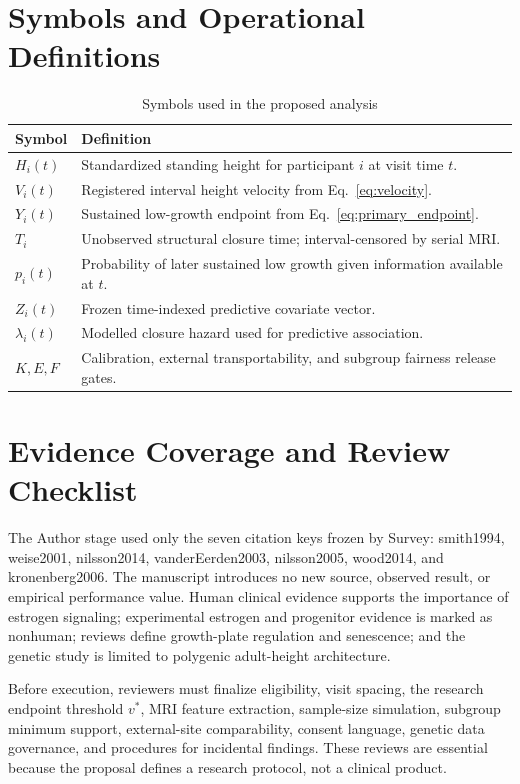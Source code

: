 \documentclass[conference]{IEEEtran}
\begin{document}
\section{Symbols and Operational Definitions}

\begin{table}[h]
\caption{Symbols used in the proposed analysis}
\label{tab:symbols}
\centering
\footnotesize
\begin{tabular}{p{}p{}}
\toprule
Symbol & Definition \\
\midrule
$H_i(t)$ & Standardized standing height for participant $i$ at visit time $t$. \\
$V_i(t)$ & Registered interval height velocity from Eq.~\eqref{eq:velocity}. \\
$Y_i(t)$ & Sustained low-growth endpoint from Eq.~\eqref{eq:primary_endpoint}. \\
$T_i$ & Unobserved structural closure time; interval-censored by serial MRI. \\
$p_i(t)$ & Probability of later sustained low growth given information available at $t$. \\
$Z_i(t)$ & Frozen time-indexed predictive covariate vector. \\
$\lambda_i(t)$ & Modelled closure hazard used for predictive association. \\
$K,E,F$ & Calibration, external transportability, and subgroup fairness release gates. \\
\bottomrule
\end{tabular}
\end{table}

\section{Evidence Coverage and Review Checklist}

The Author stage used only the seven citation keys frozen by Survey: smith1994, weise2001, nilsson2014, vanderEerden2003, nilsson2005, wood2014, and kronenberg2006. The manuscript introduces no new source, observed result, or empirical performance value. Human clinical evidence supports the importance of estrogen signaling; experimental estrogen and progenitor evidence is marked as nonhuman; reviews define growth-plate regulation and senescence; and the genetic study is limited to polygenic adult-height architecture.

Before execution, reviewers must finalize eligibility, visit spacing, the research endpoint threshold $v^*$, MRI feature extraction, sample-size simulation, subgroup minimum support, external-site comparability, consent language, genetic data governance, and procedures for incidental findings. These reviews are essential because the proposal defines a research protocol, not a clinical product.
\end{document}
